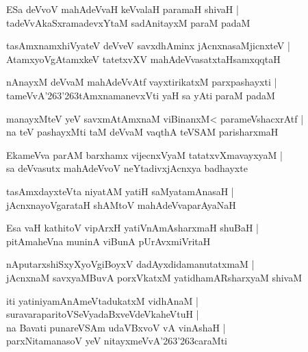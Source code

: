 \documentclass[twoside,12pt,openright]{book}
\def\S{\char'263}
\newcounter{shloka}[chapter]
\begin{document}
\begin{shloka}
ESa deVvoV mahAdeVvaH keVvalaH paramaH shivaH |\\
tadeVvAkaSxramadevxYtaM sadAnitayxM paraM padaM 
\end{shloka}

\begin{shloka}
tasAmxnamxhiVyateV deVveV savxdhAminx jAcnxnasaMjicnxteV |\\
AtamxyoVgAtamxkeV tatetxvXV mahAdeVvasatxtaHsamxqqtaH 
\end{shloka}

\begin{shloka}
nAnayxM deVvaM mahAdeVvAtf vayxtirikatxM parxpashayxti |\\
tameVvA\S\S tAmxnamanevxVti yaH sa yAti paraM padaM 
\end{shloka}

\begin{shloka}
manayxMteV yeV savxmAtAmxnaM viBinanxM< parameVshacxrAtf |\\
na teV pashayxMti taM deVvaM vaqthA teVSAM parisharxmaH 
\end{shloka}

\begin{shloka}
EkameVva parAM barxhamx vijecnxVyaM tatatxvXmavayxyaM |\\
sa deVvasutx mahAdeVvoV neYtadivxjAcnxya badhayxte
\end{shloka}

\begin{shloka}
tasAmxdayxteVta niyatAM yatiH saMyatamAnasaH |\\
jAcnxnayoVgarataH shAMtoV mahAdeVvaparAyaNaH 
\end{shloka}

\begin{shloka}
Esa vaH kathitoV vipArxH yatiVnAmAsharxmaH shuBaH |\\
pitAmaheVna muninA viBunA pUrAvxmiVritaH
\end{shloka}

\begin{shloka}
nAputarxshiSxyXyoVgiBoyxV dadAyxdidamanutatxmaM |\\
jAcnxnaM savxyaMBuvA porxVkatxM yatidhamARsharxyaM shivaM 
\end{shloka}

\begin{shloka}
iti yatiniyamAnAmeVtadukatxM vidhAnaM |\\
suravaraparitoVSeVyadaBxveVdeVkaheVtuH |\\
na Bavati punareVSAm udaVBxvoV vA vinAshaH |\\
parxNitamanasoV yeV nitayxmeVvA\S\S caraMti
\end{shloka}
\end{document}

